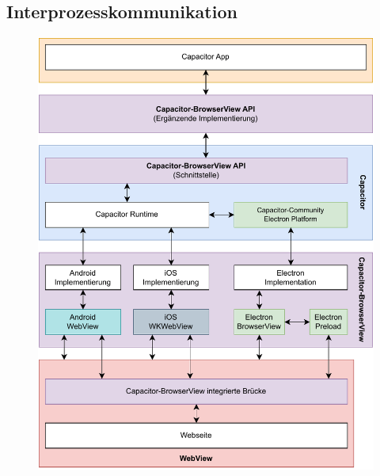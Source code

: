 \subsection{Interprozesskommunikation}

\begin{figure}[H]
    \centering
    \includegraphics[width=\textwidth]{assets/03_Capacitor-BrowserView/04_Aufbau+IPC.drawio.pdf}
\end{figure}


\clearpage
